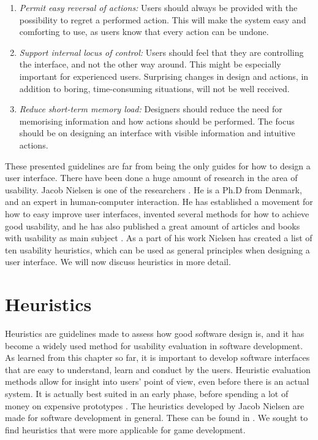 \begin{enumerate}[{e}.1]
\item \emph{Permit easy reversal of actions:} Users should always be provided with the possibility to regret a performed action. This will make the system easy and comforting to use, as users know that every action can be undone. 
\item \emph{Support internal locus of control:} Users should feel that they are controlling the interface, and not the other way around. This might be especially important for experienced users. Surprising changes in design and actions, in addition to boring, time-consuming situations, will not be well received. 
\item \emph{Reduce short-term memory load:} Designers should reduce the need for memorising information and how actions should be performed. The focus should be on designing an interface with visible information and intuitive actions.
\end{enumerate}

These presented guidelines are far from being the only guides for how to design a user interface. There have been done a huge amount of research in the area of usability. Jacob Nielsen is one of the researchers \cite{nielsen2005ten}. He is a Ph.D from Denmark, and an expert in human-computer interaction. He has established a movement for how to easy improve user interfaces, invented several methods for how to achieve good usability, and he has also published a great amount of articles and books with usability as main subject \cite{JNielsen}. As a part of his work Nielsen has created a list of ten usability heuristics, which can be used as general principles when designing a user interface\cite{nielsen2005ten}. We will now discuss heuristics in more detail.

\section{Heuristics}
\label{sec:heur}
Heuristics are guidelines made to assess how good software design is, and it has become a widely used method for usability evaluation in software development. As learned from this chapter so far, it is important to develop software interfaces that are easy to understand, learn and conduct by the users. Heuristic evaluation methods allow for insight into users' point of view, even before there is an actual system. It is actually best suited in an early phase, before spending a lot of money on expensive prototypes \cite{desurvire}. The heuristics developed by Jacob Nielsen are made for software development in general. These can be found in \cite{nielsen2005ten}. We sought to find heuristics that were more applicable for game development. 

